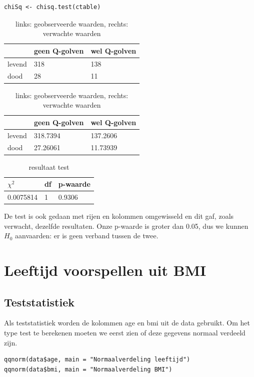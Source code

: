 \documentclass{article}
\begin{document}
\begin{verbatim}
chiSq <- chisq.test(ctable)
\end{verbatim}

\begin{table}[h]
\begin{tabular}{|l|l|l|}
\hline
       & geen Q-golven & wel Q-golven \\ \hline
levend & 318           & 138          \\ \hline
dood   & 28            & 11           \\ \hline
\end{tabular}
\quad
\begin{tabular}{|l|l|l|}
\hline
       & geen Q-golven & wel Q-golven \\ \hline
levend & 318.7394      & 137.2606     \\ \hline
dood   & 27.26061      & 11.73939     \\ \hline
\end{tabular}
\caption{links: geobserveerde waarden, rechts: verwachte waarden}
\end{table}

\begin{table}[h]
\centering
\begin{tabular}{|l|l|l|}
\hline
$\chi^2$  & df & p-waarde \\ \hline
0.0075814 & 1  & 0.9306   \\ \hline
\end{tabular}
\caption{resultaat test}
\end{table}

De test is ook gedaan met rijen en kolommen omgewisseld en dit gaf, zoals verwacht, dezelfde resultaten. Onze p-waarde is groter dan 0.05, dus we kunnen $H_0$ aanvaarden: er is geen verband tussen de twee. 

\section{Leeftijd voorspellen uit BMI}
\subsection{Teststatistiek}
Als teststatistiek worden de kolommen age en bmi uit de data gebruikt. Om het type test te berekenen moeten we eerst zien of deze gegevens normaal verdeeld zijn. 

\begin{verbatim}
qqnorm(data$age, main = "Normaalverdeling leeftijd")
qqnorm(data$bmi, main = "Normaalverdeling BMI")
\end{verbatim}
\end{document}
